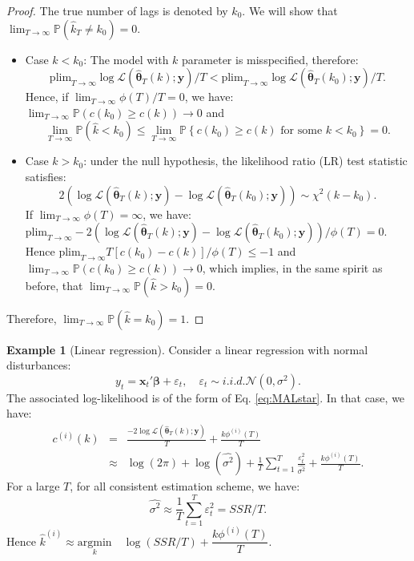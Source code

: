\documentclass[
  11pt,
]{book}
\providecommand{\tightlist}{%
  \setlength{\itemsep}{0pt}\setlength{\parskip}{0pt}}
\theoremstyle{definition}
\theoremstyle{definition}
\newtheorem{example}{Example}[chapter]
\theoremstyle{definition}
\theoremstyle{definition}
\theoremstyle{remark}
\begin{document}
\begin{proof}
The true number of lags is denoted by \(k_0\). We will show that \(\lim_{T \rightarrow \infty} \mathbb{P}(\hat{k}_T \ne k_0)=0\).

\begin{itemize}
\tightlist
\item
  Case \(k < k_0\): The model with \(k\) parameter is misspecified, therefore:
  \[
  \mbox{plim}_{T \rightarrow \infty}  \log \mathcal{L}(\hat{\boldsymbol\theta}_T(k);\mathbf{y})/T < \mbox{plim}_{T \rightarrow \infty}  \log \mathcal{L}(\hat{\boldsymbol\theta}_T(k_0);\mathbf{y})/T.
  \]
  Hence, if \(\lim_{T \rightarrow \infty} \phi(T)/T = 0\), we have: \(\lim_{T \rightarrow \infty} \mathbb{P}(c(k_0) \ge c(k)) \rightarrow 0\) and
  \[
  \lim_{T \rightarrow \infty} \mathbb{P}(\hat{k}<k_0) \le \lim_{T \rightarrow \infty} \mathbb{P}\left\{c(k_0) \ge c(k) \mbox{ for some $k < k_0$}\right\} = 0.
  \]
\item
  Case \(k > k_0\): under the null hypothesis, the likelihood ratio (LR) test statistic satisfies:
  \[
  2 \left(\log \mathcal{L}(\hat{\boldsymbol\theta}_T(k);\mathbf{y})-\log \mathcal{L}(\hat{\boldsymbol\theta}_T(k_0);\mathbf{y})\right) \sim \chi^2(k-k_0).
  \]
  If \(\lim_{T \rightarrow \infty} \phi(T) = \infty\), we have: \(\mbox{plim}_{T \rightarrow \infty} -2 \left(\log \mathcal{L}(\hat{\boldsymbol\theta}_T(k);\mathbf{y})-\log \mathcal{L}(\hat{\boldsymbol\theta}_T(k_0);\mathbf{y})\right)/\phi(T) = 0\). Hence \(\mbox{plim}_{T \rightarrow \infty} T[c(k_0) - c(k)]/\phi(T) \le -1\) and \(\lim_{T \rightarrow \infty} \mathbb{P}(c(k_0) \ge c(k)) \rightarrow 0\), which implies, in the same spirit as before, that \(\lim_{T \rightarrow \infty} \mathbb{P}(\hat{k}>k_0) = 0\).
\end{itemize}

Therefore, \(\lim_{T \rightarrow \infty} \mathbb{P}(\hat{k}=k_0) = 1\).
\end{proof}

\begin{example}[Linear regression]
\protect\hypertarget{exm:ICOLS}{}\label{exm:ICOLS}Consider a linear regression with normal disturbances:
\[
y_t = \mathbf{x}_t' \boldsymbol\beta + \varepsilon_t, \quad \varepsilon_t \sim i.i.d. \mathcal{N}(0,\sigma^2).
\]
The associated log-likelihood is of the form of Eq. \eqref{eq:MALstar}. In that case, we have:
\begin{eqnarray*}
c^{(i)}(k) &=& \frac{- 2 \log \mathcal{L}(\hat{\boldsymbol\theta}_T(k);\mathbf{y})}{T} + \frac{k\phi^{(i)}(T)}{T}\\
&\approx& \log(2\pi) + \log(\widehat{\sigma^2}) + \frac{1}{T}\sum_{t=1}^T \frac{\varepsilon_t^2}{\widehat{\sigma^2}} + \frac{k\phi^{(i)}(T)}{T}.
\end{eqnarray*}
For a large \(T\), for all consistent estimation scheme, we have:
\[
\widehat{\sigma^2} \approx \frac{1}{T}\sum_{t=1}^T \varepsilon_t^2 = SSR/T.
\]
Hence \(\hat{k}^{(i)} \approx \underset{k}{\mbox{argmin}} \quad  \log(SSR/T) + \dfrac{k\phi^{(i)}(T)}{T}\).
\end{example}
\end{document}
